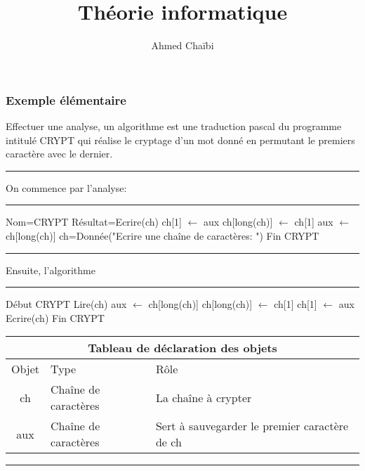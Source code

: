 \documentclass{article}
\title{Théorie informatique}
\author{Ahmed Chaïbi}
\begin{document}
\maketitle
\subsubsection*{Exemple élémentaire}
Effectuer une analyse, un algorithme est une traduction pascal du programme intitulé CRYPT qui réalise le cryptage d'un mot donné en permutant le premiers caractère avec le dernier.
  \vspace{0.3cm}
  \hrule
  \vspace{0.3cm}
On commence par l'analyse:
  \vspace{0.3cm}
  \hrule
  \vspace{0.3cm}
  \begin{algorithmic}[1]
\setcounter{ALG@line}{-1}
\State  Nom=CRYPT
\setcounter{ALG@line}{4}
\State 	Résultat=Ecrire(ch)
\setcounter{ALG@line}{3}
\State	ch[1] $\leftarrow$ aux
\setcounter{ALG@line}{2}
\State	ch[long(ch)] $\leftarrow$ ch[1]
\setcounter{ALG@line}{1}
\State	aux $\leftarrow$ ch[long(ch)]
\setcounter{ALG@line}{0}
\State  ch=Donnée("Ecrire une chaîne de caractères: ")
\setcounter{ALG@line}{5}
\State	Fin CRYPT
  \end{algorithmic}
  \vspace{0.3cm}
  \hrule
  \vspace{0.3cm}



Ensuite, l'algorithme
  \vspace{0.3cm}
  \hrule
  \vspace{0.3cm}
  \begin{minipage}{0.32\textwidth}
  \begin{algorithmic}[1]
\setcounter{ALG@line}{-1}
\Statex  Début CRYPT
\State	Lire(ch)
\State	aux $\leftarrow$ ch[long(ch)]
\State	ch[long(ch)] $\leftarrow$ ch[1]
\State	ch[1] $\leftarrow$ aux
\State  Ecrire(ch)
\State	Fin CRYPT
  \end{algorithmic}
   \end{minipage}%
   \begin{minipage}{0.68\textwidth}
	   \begin{tabular}{|c|m{1.8cm}|m{3.25cm}|}
		   \hline
\multicolumn{3}{|c|}{Tableau de déclaration des objets} \\
\hline
Objet & Type & Rôle \\
\hline\hline
ch & Chaîne de caractères & La chaîne à crypter \\
\hline
aux & Chaîne de caractères & Sert à sauvegarder le premier caractère de ch\\
\hline
\end{tabular}
   \end{minipage}
  \vspace{0.3cm}
  \hrule
  \vspace{0.3cm}
\end{document}
